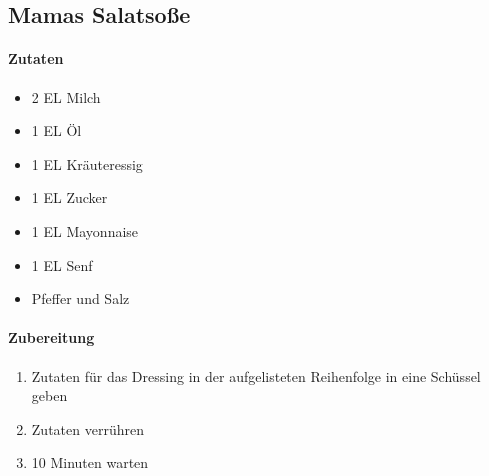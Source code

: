 \newpage
\subsection{Mamas Salatsoße}
\paragraph{Zutaten}
\begin{itemize}[noitemsep]
	\item 2 EL Milch
	\item 1 EL Öl
	\item 1 EL Kräuteressig
	\item 1 EL Zucker
	\item 1 EL Mayonnaise
	\item 1 EL Senf
	\item Pfeffer und Salz
\end{itemize}
\paragraph{Zubereitung}
\begin{enumerate}[noitemsep]
	\item Zutaten für das Dressing in der aufgelisteten Reihenfolge in eine Schüssel geben
	\item Zutaten verrühren
	\item 10 Minuten warten
\end{enumerate}
